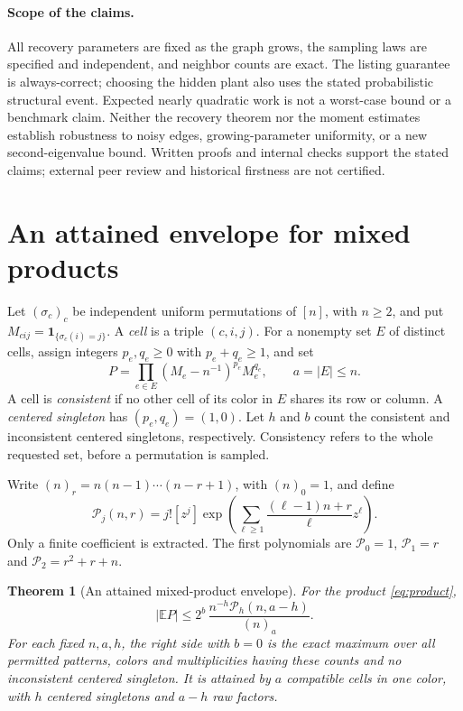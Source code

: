 \documentclass[11pt]{article}
\newtheorem{theorem}{Theorem}[section]
\theoremstyle{definition}
\theoremstyle{remark}
\newcommand{\E}{\mathbb E}
\newcommand{\1}{\mathbf 1}
\begin{document}
\paragraph{Scope of the claims.}
All recovery parameters are fixed as the graph grows, the sampling laws
are specified and independent, and neighbor counts are exact. The
listing guarantee is always-correct; choosing the hidden plant also uses
the stated probabilistic structural event. Expected nearly quadratic
work is not a worst-case bound or a benchmark claim. Neither the
recovery theorem nor the moment estimates establish robustness to noisy
edges, growing-parameter uniformity, or a new second-eigenvalue bound.
Written proofs and internal checks support the stated claims; external
peer review and historical firstness are not certified.

\section{An attained envelope for mixed products}\label{sec:mixed}

Let $(\sigma_c)_c$ be independent uniform permutations of $[n]$, with $n\ge2$, and put $M_{cij}=\1_{\{\sigma_c(i)=j\}}$. A \emph{cell} is a triple $(c,i,j)$. For a nonempty set $E$ of distinct cells, assign integers $p_e,q_e\ge0$ with $p_e+q_e\ge1$, and set
\begin{equation}\label{eq:product}
P=\prod_{e\in E}(M_e-n^{-1})^{p_e}M_e^{q_e},\qquad a=|E|\le n.
\end{equation}
A cell is \emph{consistent} if no other cell of its color in $E$ shares its row or column. A \emph{centered singleton} has $(p_e,q_e)=(1,0)$. Let $h$ and $b$ count the consistent and inconsistent centered singletons, respectively. Consistency refers to the whole requested set, before a permutation is sampled.

Write $(n)_r=n(n-1)\cdots(n-r+1)$, with $(n)_0=1$, and define
\begin{equation}\label{eq:depletedpoly}
\mathcal P_j(n,r)
=j![z^j]\exp\left(\sum_{\ell\ge1}
\frac{(\ell-1)n+r}{\ell}z^\ell\right).
\end{equation}
Only a finite coefficient is extracted. The first polynomials are
$\mathcal P_0=1$, $\mathcal P_1=r$ and $\mathcal P_2=r^2+r+n$.

\begin{theorem}[An attained mixed-product envelope]\label{thm:mixed}
For the product \eqref{eq:product},
\begin{equation}\label{eq:mixedexact}
|\E P|\le 2^b\,\frac{n^{-h}\mathcal P_h(n,a-h)}{(n)_a}.
\end{equation}
For each fixed $n,a,h$, the right side with $b=0$ is the exact maximum over all permitted patterns, colors and multiplicities having these counts and no inconsistent centered singleton. It is attained by $a$ compatible cells in one color, with $h$ centered singletons and $a-h$ raw factors.
\end{theorem}
\end{document}
